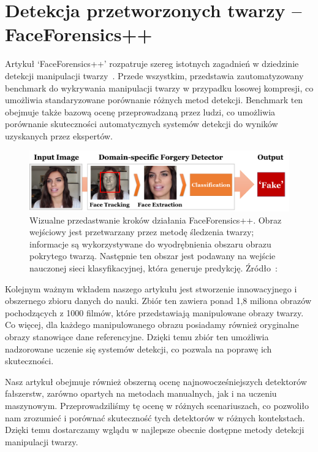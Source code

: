 \section{Detekcja przetworzonych twarzy -- FaceForensics++}
Artykuł `FaceForensics++' rozpatruje szereg istotnych zagadnień w dziedzinie detekcji manipulacji twarzy~\cite{rossler2019faceforensics++}.
Przede wszystkim, przedstawia zautomatyzowany benchmark do wykrywania manipulacji twarzy w przypadku losowej kompresji, co umożliwia standaryzowane porównanie różnych metod detekcji.
Benchmark ten obejmuje także bazową ocenę przeprowadzaną przez ludzi, co umożliwia porównanie skuteczności automatycznych systemów detekcji do wyników uzyskanych przez ekspertów.

\begin{figure}[h]
    \includegraphics[width=0.9\linewidth]{img/FF++detection_pipeline}
    \caption{ Wizualne przedastwanie kroków działania FaceForensics++.
    Obraz wejściowy jest przetwarzany przez metodę śledzenia twarzy; informacje są wykorzystywane do wyodrębnienia obszaru obrazu pokrytego twarzą. Następnie ten obszar jest podawany na wejście nauczonej sieci klasyfikacyjnej, która generuje predykcję.
    Źródło~\cite{rossler2019faceforensics++}:}
    \label{img:FFPileline}
\end{figure}

Kolejnym ważnym wkładem naszego artykułu jest stworzenie innowacyjnego i obszernego zbioru danych do nauki.
Zbiór ten zawiera ponad 1,8 miliona obrazów pochodzących z 1000 filmów, które przedstawiają manipulowane obrazy twarzy.
Co więcej, dla każdego manipulowanego obrazu posiadamy również oryginalne obrazy stanowiące dane referencyjne.
Dzięki temu zbiór ten umożliwia nadzorowane uczenie się systemów detekcji, co pozwala na poprawę ich skuteczności.

Nasz artykuł obejmuje również obszerną ocenę najnowocześniejszych detektorów fałszerstw, zarówno opartych na metodach manualnych, jak i na uczeniu maszynowym.
Przeprowadziliśmy tę ocenę w różnych scenariuszach, co pozwoliło nam zrozumieć i porównać skuteczność tych detektorów w różnych kontekstach.
Dzięki temu dostarczamy wglądu w najlepsze obecnie dostępne metody detekcji manipulacji twarzy.

